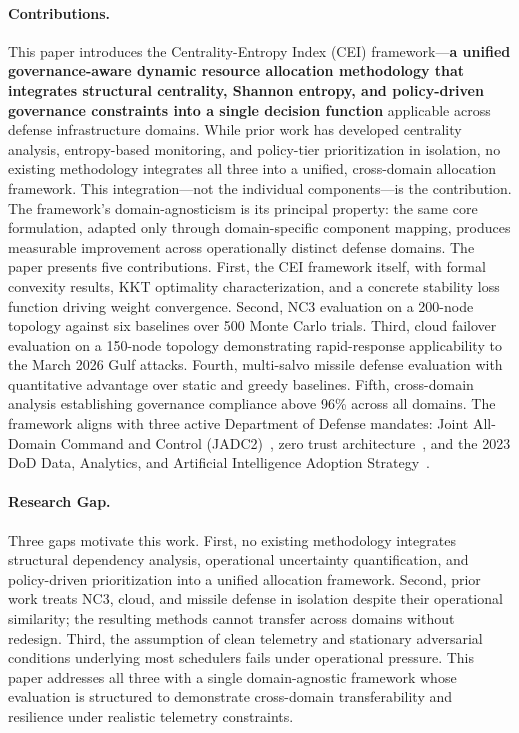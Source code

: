 \documentclass[runningheads]{llncs}
\begin{document}
\paragraph{Contributions.}
This paper introduces the Centrality-Entropy Index (CEI) framework---\textbf{a unified governance-aware dynamic resource allocation methodology that integrates structural centrality, Shannon entropy, and policy-driven governance constraints into a single decision function} applicable across defense infrastructure domains. While prior work has developed centrality analysis, entropy-based monitoring, and policy-tier prioritization in isolation, no existing methodology integrates all three into a unified, cross-domain allocation framework. This integration---not the individual components---is the contribution. The framework's domain-agnosticism is its principal property: the same core formulation, adapted only through domain-specific component mapping, produces measurable improvement across operationally distinct defense domains. The paper presents five contributions. First, the CEI framework itself, with formal convexity results, KKT optimality characterization, and a concrete stability loss function driving weight convergence. Second, NC3 evaluation on a 200-node topology against six baselines over 500 Monte Carlo trials. Third, cloud failover evaluation on a 150-node topology demonstrating rapid-response applicability to the March 2026 Gulf attacks. Fourth, multi-salvo missile defense evaluation with quantitative advantage over static and greedy baselines. Fifth, cross-domain analysis establishing governance compliance above 96\% across all domains. The framework aligns with three active Department of Defense mandates: Joint All-Domain Command and Control (JADC2)~\cite{jadc2}, zero trust architecture~\cite{gao_it}, and the 2023 DoD Data, Analytics, and Artificial Intelligence Adoption Strategy~\cite{dod_ai}.

\paragraph{Research Gap.}
Three gaps motivate this work. First, no existing methodology integrates structural dependency analysis, operational uncertainty quantification, and policy-driven prioritization into a unified allocation framework. Second, prior work treats NC3, cloud, and missile defense in isolation despite their operational similarity; the resulting methods cannot transfer across domains without redesign. Third, the assumption of clean telemetry and stationary adversarial conditions underlying most schedulers fails under operational pressure. This paper addresses all three with a single domain-agnostic framework whose evaluation is structured to demonstrate cross-domain transferability and resilience under realistic telemetry constraints.
\end{document}
